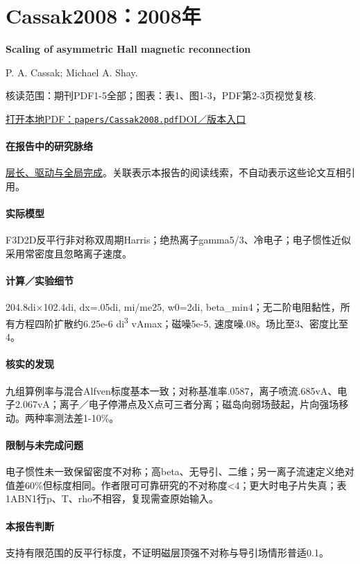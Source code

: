 \section{Cassak2008：2008年}\label{paper:Cassak2008}

\textbf{Scaling of asymmetric Hall magnetic reconnection}\citep{Cassak2008}\

P. A. Cassak;  Michael A. Shay.

\textsf{核读范围：}期刊PDF1-5全部；\textsf{图表：}表1、图1-3，PDF第2-3页视觉复核.

\href{run:papers/Cassak2008.pdf}{打开本地PDF：\texttt{papers/Cassak2008.pdf}}\quad\href{https://doi.org/10.1029/2008gl035268}{DOI／版本入口}

\paragraph{在报告中的研究脉络}\hyperref[story:global]{层长、驱动与全局完成}。关联表示本报告的阅读线索，不自动表示这些论文互相引用。

\paragraph{实际模型}F3D2D反平行非对称双周期Harris；绝热离子gamma5/3、冷电子；电子惯性近似采用常密度且忽略离子速度。

\paragraph{计算／实验细节}204.8di×102.4di, dx=.05di, mi/me25, w0=2di, beta\_min4；无二阶电阻黏性，所有方程四阶扩散约6.25e-6 di\textsuperscript{3} vAmax；磁噪5e-5, 速度噪.08。场比至3、密度比至4。

\paragraph{核实的发现}九组算例率与混合Alfven标度基本一致；对称基准率.0587，离子喷流.685vA、电子2.067vA；离子／电子停滞点及X点可三者分离；磁岛向弱场鼓起，片向强场移动。两种率测法差1-10\%。

\paragraph{限制与未完成问题}电子惯性未一致保留密度不对称；高beta、无导引、二维；另一离子流速定义绝对值差60\%但标度相同。作者限可可靠研究的不对称度<4；更大时电子片失真；表1ABN1行p、T、rho不相容，复现需查原始输入。

\paragraph{本报告判断}支持有限范围的反平行标度，不证明磁层顶强不对称与导引场情形普适0.1。

